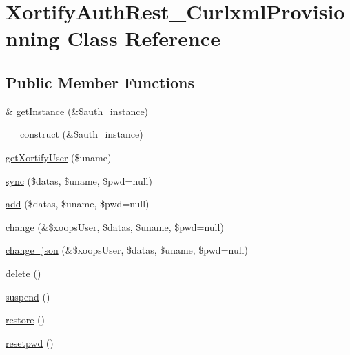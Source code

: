\hypertarget{class_xortify_auth_rest___curlxml_provisionning}{\section{Xortify\-Auth\-Rest\-\_\-\-Curlxml\-Provisionning Class Reference}
\label{class_xortify_auth_rest___curlxml_provisionning}
}
\subsection*{Public Member Functions}
\begin{DoxyCompactItemize}
\item 
\& \hyperlink{class_xortify_auth_rest___curlxml_provisionning_a2c8eaa915c70d75289ac8a03686194f9}{get\-Instance} (\&\$auth\-\_\-instance)
\item 
\hyperlink{class_xortify_auth_rest___curlxml_provisionning_a0f25832dc86774e7605b81fe57b083c2}{\-\_\-\-\_\-construct} (\&\$auth\-\_\-instance)
\item 
\hyperlink{class_xortify_auth_rest___curlxml_provisionning_a041d726ac26672547ed1504e8e0117aa}{get\-Xortify\-User} (\$uname)
\item 
\hyperlink{class_xortify_auth_rest___curlxml_provisionning_a35dc08b0f2138eb818ff95345b73bcff}{sync} (\$datas, \$uname, \$pwd=null)
\item 
\hyperlink{class_xortify_auth_rest___curlxml_provisionning_adfc9fcef01e7bd7b2f47e8e79d51fc63}{add} (\$datas, \$uname, \$pwd=null)
\item 
\hyperlink{class_xortify_auth_rest___curlxml_provisionning_ae1f0971b9712c794620cf309164e43af}{change} (\&\$xoops\-User, \$datas, \$uname, \$pwd=null)
\item 
\hyperlink{class_xortify_auth_rest___curlxml_provisionning_a94f4e0408f26e65abca347ec883f4ec9}{change\-\_\-json} (\&\$xoops\-User, \$datas, \$uname, \$pwd=null)
\item 
\hyperlink{class_xortify_auth_rest___curlxml_provisionning_a13bdffdd926f26b825ea57066334ff01}{delete} ()
\item 
\hyperlink{class_xortify_auth_rest___curlxml_provisionning_ad73006a505121228f3b075c2409787d2}{suspend} ()
\item 
\hyperlink{class_xortify_auth_rest___curlxml_provisionning_aa1371f22826cf8cde4454c9b467203d0}{restore} ()
\item 
\hyperlink{class_xortify_auth_rest___curlxml_provisionning_a06d70fbd3a2db390b6f2530c0076628e}{resetpwd} ()
\end{DoxyCompactItemize}
